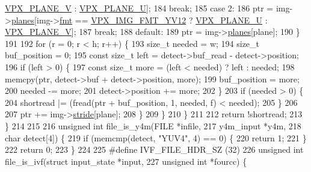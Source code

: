 \begin{DoxyCodeInclude}
{{      \hyperlink{vpx__image_8h_aca9436ec761457cc6d2e356e0ac2fd23}{VPX\_PLANE\_V} : \hyperlink{vpx__image_8h_a4770fc8fa60021a2229f25553152cf81}{VPX\_PLANE\_U}];
184           \textcolor{keywordflow}{break};
185         \textcolor{keywordflow}{case} 2:
186           ptr = img->\hyperlink{structvpx__image_ab6258308ba7a5f4a113348120e20e2ce}{planes}[img->\hyperlink{structvpx__image_a1d734f8afa9200a21c2d9f6bcf8c04d8}{fmt} == \hyperlink{vpx__image_8h_a7a30a7bff7400fb83ad45fede5077193a6e4e8961bbcf96478c300dc4c3e1dc18}{VPX\_IMG\_FMT\_YV12} ? 
      \hyperlink{vpx__image_8h_a4770fc8fa60021a2229f25553152cf81}{VPX\_PLANE\_U} : \hyperlink{vpx__image_8h_aca9436ec761457cc6d2e356e0ac2fd23}{VPX\_PLANE\_V}];
187           \textcolor{keywordflow}{break};
188         \textcolor{keywordflow}{default}:
189           ptr = img->\hyperlink{structvpx__image_ab6258308ba7a5f4a113348120e20e2ce}{planes}[plane];
190       \}
191 
192       \textcolor{keywordflow}{for} (r = 0; r < h; r++) \{
193         \textcolor{keywordtype}{size\_t} needed = w;
194         \textcolor{keywordtype}{size\_t} buf\_position = 0;
195         \textcolor{keyword}{const} \textcolor{keywordtype}{size\_t} left = detect->buf\_read - detect->position;
196         \textcolor{keywordflow}{if} (left > 0) \{
197           \textcolor{keyword}{const} \textcolor{keywordtype}{size\_t} more = (left < needed) ? left : needed;
198           memcpy(ptr, detect->buf + detect->position, more);
199           buf\_position = more;
200           needed -= more;
201           detect->position += more;
202         \}
203         \textcolor{keywordflow}{if} (needed > 0) \{
204           shortread |= (fread(ptr + buf\_position, 1, needed, f) < needed);
205         \}
206 
207         ptr += img->\hyperlink{structvpx__image_ac9c7b83e3eea44cb680956f90dc789cf}{stride}[plane];
208       \}
209     \}
210   \}
211 
212   \textcolor{keywordflow}{return} !shortread;
213 \}
214 
215 
216 \textcolor{keywordtype}{unsigned} \textcolor{keywordtype}{int} file\_is\_y4m(FILE      *infile,
217                          y4m\_input *y4m,
218                          \textcolor{keywordtype}{char}       detect[4]) \{
219   \textcolor{keywordflow}{if} (memcmp(detect, \textcolor{stringliteral}{"YUV4"}, 4) == 0) \{
220     \textcolor{keywordflow}{return} 1;
221   \}
222   \textcolor{keywordflow}{return} 0;
223 \}
224 
225 \textcolor{preprocessor}{#define IVF\_FILE\_HDR\_SZ (32)}
226 \textcolor{keywordtype}{unsigned} \textcolor{keywordtype}{int} file\_is\_ivf(\textcolor{keyword}{struct} input\_state *input,
227                          \textcolor{keywordtype}{unsigned} \textcolor{keywordtype}{int} *fourcc) \{
}}
\end{DoxyCodeInclude}
